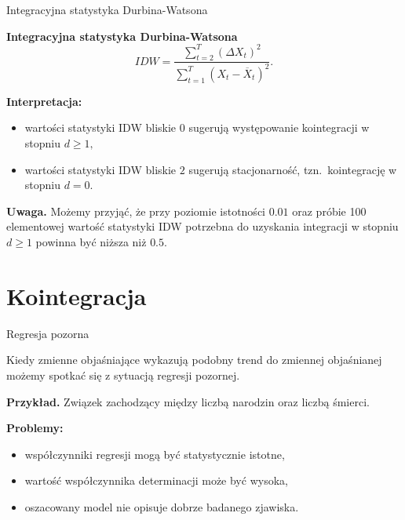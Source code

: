 \documentclass[a4paper, 11pt]{beamer}
\begin{document}
	\begin{frame}{Integracyjna statystyka Durbina-Watsona}
		\begin{block}{\textbf{Integracyjna statystyka Durbina-Watsona}} \[
			IDW = \frac{\sum_{t=2}^{T}\left(\Delta X_{t}\right)^{2}}{\sum_{t=1}^{T}\left(X_{t} - \overline{X}_t\right)^2}.
		\]
		\end{block}
		\textbf{Interpretacja:}
		\begin{itemize}
			\item wartości statystyki IDW bliskie $0$ sugerują występowanie kointegracji w stopniu $d \geq 1,$
			\item wartości statystyki IDW bliskie $2$ sugerują stacjonarność, tzn.~kointegrację w stopniu $d = 0.$
		\end{itemize}
		\begin{alert}{\textbf{Uwaga.}}
			Możemy przyjąć, że przy poziomie istotności $0.01$ oraz próbie 100 elementowej
			wartość statystyki IDW potrzebna do uzyskania integracji w stopniu $d \geq 1$
			powinna być niższa niż $0.5.$
		\end{alert}
	\end{frame}
	
	\section{Kointegracja}
	
	\begin{frame}{Regresja pozorna}
		\begin{flushleft}
			Kiedy zmienne objaśniające wykazują podobny trend do zmiennej objaśnianej możemy spotkać się z sytuacją regresji pozornej.
		\end{flushleft}
		\begin{flushleft}
			\begin{alert}{\textbf{Przykład.}}
				Związek zachodzący między liczbą narodzin oraz liczbą śmierci.
			\end{alert}
		\end{flushleft}
		\textbf{Problemy:}
		\begin{itemize}
			\item współczynniki regresji mogą być statystycznie istotne,
			\item wartość współczynnika determinacji może być wysoka,
			\item oszacowany model nie opisuje dobrze badanego zjawiska.
		\end{itemize}
	\end{frame}
	
\end{document}

